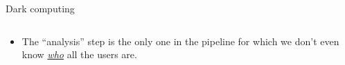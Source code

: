 \documentclass[aspectratio=169]{beamer}
\begin{document}




\begin{frame}{Dark computing}
\vspace{0.25 cm}
\begin{columns}
\end{columns}

\vspace{0.5 cm}
\begin{itemize}
\item<3-> The ``analysis'' step is the only one in the pipeline for which we don't even know \underline{\it who} all the users are.
\end{itemize}
\end{frame}
\end{document}
